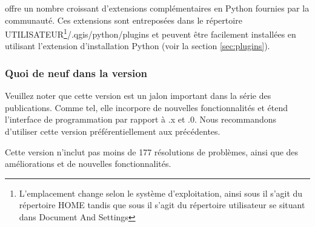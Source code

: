 
\qg offre un nombre croissant d'extensions complémentaires en Python fournies par la communauté. Ces extensions sont entreposées dans le répertoire UTILISATEUR\footnote{L'emplacement change selon le système d'exploitation, ainsi sous \nix{} il s'agit du répertoire HOME tandis que sous \win{} il s'agit du répertoire utilisateur se situant dans Document And Settings}/.qgis/python/plugins et peuvent être facilement installées en utilisant l'extension d'installation Python (voir la section \ref{sec:plugins}). 

\subsubsection{Quoi de neuf dans la version ~\CURRENT} 

Veuillez noter que cette version est un jalon important dans la série des publications. Comme tel, elle incorpore de nouvelles fonctionnalités et étend l'interface de programmation par rapport à .x et .0. Nous recommandons d'utiliser cette version préférentiellement aux précédentes.

Cette version n'inclut pas moins de 177 résolutions de problèmes, ainsi que des améliorations et de nouvelles fonctionnalités.


